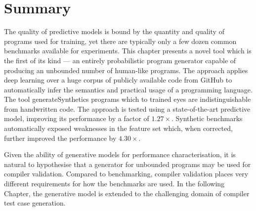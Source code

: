 \section{Summary}%
\label{sec:clgen-conclusion}

The quality of predictive models is bound by the quantity and quality of programs used for training, yet there are typically only a few dozen common benchmarks available for experiments. This chapter presents a novel tool which is the first of its kind --- an entirely probabilistic program generator capable of producing an unbounded number of human-like programs. The approach applies deep learning over a huge corpus of publicly available code from GitHub to automatically infer the semantics and practical usage of a programming language. The tool generateSynthetics programs which to trained eyes are indistinguishable from handwritten code. The approach is tested using a state-of-the-art predictive model, improving its performance by a factor of $1.27\times$. Synthetic benchmarks automatically exposed weaknesses in the feature set which, when corrected, further improved the performance by $4.30\times$.

Given the ability of generative models for performance characterisation, it is natural to hypothesise that a generator for unbounded programs may be used for compiler validation. Compared to benchmarking, compiler validation places very different requirements for how the benchmarks are used. In the following Chapter, the generative model is extended to the challenging domain of compiler test case generation.
